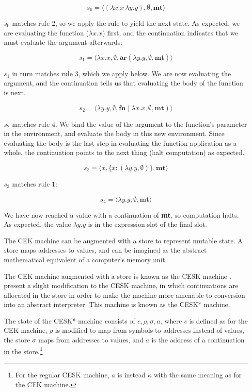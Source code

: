 \documentclass{article}
\begin{document}
$$ s_0 = \langle (\lambda x.x\ \lambda y.y), \emptyset, \textbf{mt} \rangle $$

$s_0$ matches rule 2, so we apply the rule to yield the next state. As expected, we are evaluating the function ($\lambda x.x$) first, and the continuation indicates that we must evaluate the argument afterwards:

$$ s_1 = \langle \lambda x.x, \emptyset, \textbf{ar}(\lambda y.y, \emptyset, \textbf{mt}) \rangle $$

$s_1$ in turn matches rule 3, which we apply below. We are now evaluating the argument, and the continuation tells us that evaluating the body of the function is next.

$$ s_2 = \langle \lambda y.y, \emptyset, \textbf{fn}(\lambda x.x, \emptyset, \textbf{mt}) \rangle $$

$s_2$ matches rule 4. We bind the value of the argument to the function's parameter in the environment, and evaluate the body in this new environment. Since evaluating the body is the last step in evaluating the function application as a whole, the continuation points to the next thing (halt computation) as expected.

$$ s_3 = \langle x, \{ x: (\lambda y.y, \emptyset) \}, \textbf{mt} \rangle $$

$s_3$ matches rule 1:

$$ s_4 = \langle \lambda y.y, \emptyset, \textbf{mt} \rangle $$

We have now reached a value with a continuation of \textbf{mt}, so computation halts. As expected, the value $\lambda y.y$ is in the expression slot of the final slot.

The CEK machine can be augmented with a store to represent mutable state. A store maps addresses to values, and can be imagined as the abstract mathematical equivalent of a computer's memory unit.

The CEK machine augmented with a store is known as the CESK machine \cite{cesk}. \cite{aam} present a slight modification to the CESK machine, in which continuations are allocated in the store in order to make the machine more amenable to conversion into an abstract interpreter. This machine is known as the CESK* machine.

The state of the CESK* machine consists of $c, \rho, \sigma, a$, where $c$ is defined as for the CEK machine, $\rho$ is modified to map from symbols to addresses instead of values, the store $\sigma$ maps from addresses to values, and $a$ is the address of a continuation in the store.\footnote{For the regular CESK machine, $a$ is instead $\kappa$ with the same meaning as for the CEK machine.}
\end{document}
